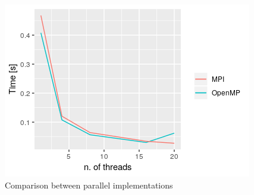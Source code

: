\documentclass[]{scrartcl}
\begin{document}
\begin{figure}[h!]
	\begin{centering}
		\includegraphics[scale=1]{plot_ok}
		\caption{Comparison between parallel implementations}
		\label{fig_2}
	\end{centering}
\end{figure}
\end{document}
